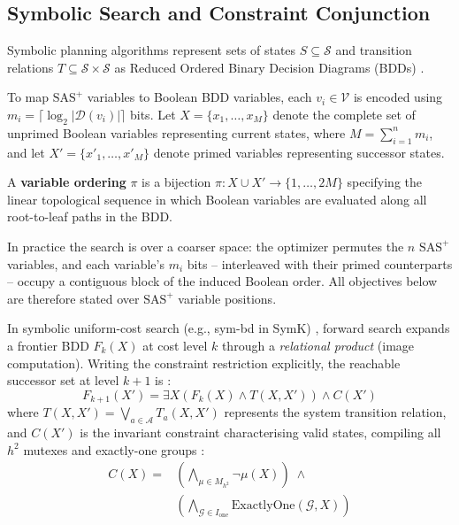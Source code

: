 \documentclass[twocolumn,10pt]{article}
\begin{document}
\subsection{Symbolic Search and Constraint Conjunction}
Symbolic planning algorithms represent sets of states $S \subseteq \mathcal{S}$ and transition relations $T \subseteq \mathcal{S} \times \mathcal{S}$ as Reduced Ordered Binary Decision Diagrams (BDDs) \cite{kissmann2014bdd, torralba2014symba}.

To map $\text{SAS}^+$ variables to Boolean BDD variables, each $v_i \in \mathcal{V}$ is encoded using $m_i = \lceil \log_2 |\mathcal{D}(v_i)| \rceil$ bits. Let $X = \{x_1, \dots, x_M\}$ denote the complete set of unprimed Boolean variables representing current states, where $M = \sum_{i=1}^n m_i$, and let $X' = \{x'_1, \dots, x'_M\}$ denote primed variables representing successor states.

\begin{tcolorbox}[
  enhanced,
  colback=gray!5!white,
  colframe=gray!80!black,
  fonttitle=\bfseries\color{white},
  title={Definition (Variable Ordering)},
  arc=3pt,
  boxrule=0.8pt,
  left=8pt, right=8pt, top=6pt, bottom=6pt
]
A \textbf{variable ordering} $\pi$ is a bijection $\pi: X \cup X' \to \{1, \dots, 2M\}$ specifying the linear topological sequence in which Boolean variables are evaluated along all root-to-leaf paths in the BDD.
\end{tcolorbox}

In practice the search is over a coarser space: the optimizer permutes the $n$ $\text{SAS}^+$ variables, and each variable's $m_i$ bits -- interleaved with their primed counterparts -- occupy a contiguous block of the induced Boolean order. All objectives below are therefore stated over $\text{SAS}^+$ variable positions.

In symbolic uniform-cost search (e.g., \textsf{sym-bd} in \textsf{SymK}) \cite{speck2020symk, torralba2014symba}, forward search expands a frontier BDD $F_k(X)$ at cost level $k$ through a \emph{relational product} (image computation). Writing the constraint restriction explicitly, the reachable successor set at level $k+1$ is \cite{torralba2013constrained}:
\begin{equation}
    F_{k+1}(X') = \exists X \left( F_k(X) \land T(X, X') \right) \land C(X')
    \label{eq:image_comp}
\end{equation}
where $T(X, X') = \bigvee_{a \in \mathcal{A}} T_a(X, X')$ represents the system transition relation, and $C(X')$ is the invariant constraint characterising valid states, compiling all $h^2$ mutexes and exactly-one groups \cite{torralba2013constrained}:
\begin{equation}
\begin{aligned}
    C(X) = &\left( \textstyle\bigwedge_{\mu \in M_{h^2}} \neg \mu(X) \right) \;\land \\
           &\left( \textstyle\bigwedge_{\mathcal{G} \in I_{\text{one}}} \text{ExactlyOne}(\mathcal{G}, X) \right)
\end{aligned}
\label{eq:constraint_bdd}
\end{equation}
\end{document}
